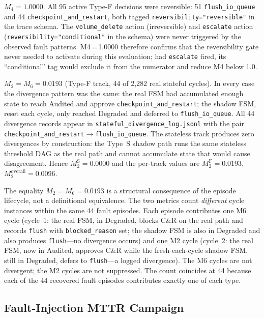 \documentclass[conference]{IEEEtran}
\begin{document}
$M_4 = 1.0000$. All 95 active Type-F decisions were reversible: 51 \texttt{flush\_io\_queue} and 44 \texttt{checkpoint\_and\_restart}, both tagged \texttt{reversibility="reversible"} in the trace schema. The \texttt{volume\_delete} action (irreversible) and \texttt{escalate} action (\texttt{reversibility="conditional"} in the schema) were never triggered by the observed fault patterns. M4\,=\,1.0000 therefore confirms that the reversibility gate never needed to activate during this evaluation; had \texttt{escalate} fired, its ``conditional'' tag would exclude it from the numerator and reduce M4 below 1.0.

$M_2 = M_6 = 0.0193$ (Type-F track, 44 of 2,282 real stateful cycles). In every case the divergence pattern was the same: the real FSM had accumulated enough state to reach Audited and approve \texttt{checkpoint\_and\_restart}; the shadow FSM, reset each cycle, only reached Degraded and deferred to \texttt{flush\_io\_queue}. All 44 divergence records appear in \texttt{stateful\_divergence\_log.jsonl} with the pair \texttt{checkpoint\_and\_restart}$\rightarrow$\texttt{flush\_io\_queue}. The stateless track produces zero divergences by construction: the Type~S shadow path runs the same stateless threshold DAG as the real path and cannot accumulate state that would cause disagreement. Hence $M_2^\mathrm{S} = 0.0000$ and the per-track values are $M_2^\mathrm{F} = 0.0193$, $M_2^\mathrm{overall} = 0.0096$.

The equality $M_2 = M_6 = 0.0193$ is a structural consequence of the episode lifecycle, not a definitional equivalence. The two metrics count \emph{different} cycle instances within the same 44 fault episodes. Each episode contributes one M6 cycle (cycle~1: the real FSM, in Degraded, blocks C\&R on the real path and records \texttt{flush} with \texttt{blocked\_reason} set; the shadow FSM is also in Degraded and also produces \texttt{flush}---no divergence occurs) and one M2 cycle (cycle~2: the real FSM, now in Audited, approves C\&R while the fresh-each-cycle shadow FSM, still in Degraded, defers to \texttt{flush}---a logged divergence). The M6 cycles are not divergent; the M2 cycles are not suppressed. The count coincides at 44 because each of the 44 recovered fault episodes contributes exactly one of each type.

\subsection{Fault-Injection MTTR Campaign}
\label{sec:m3}
\end{document}
